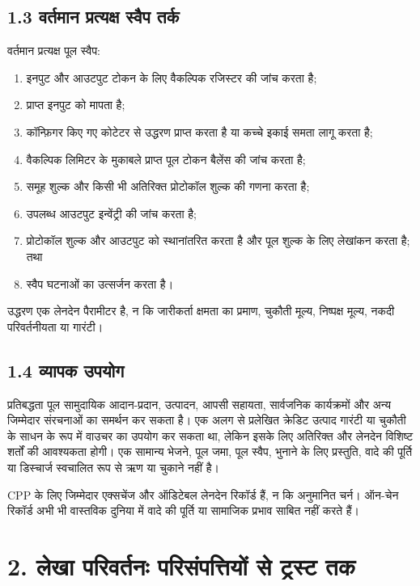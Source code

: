 \documentclass[11pt]{article}
\begin{document}
\subsection*{1.3 वर्तमान प्रत्यक्ष स्वैप तर्क}

वर्तमान प्रत्यक्ष पूल स्वैप:

\begin{enumerate}[leftmargin=*]
\item इनपुट और आउटपुट टोकन के लिए वैकल्पिक रजिस्टर की जांच करता है;
\item प्राप्त इनपुट को मापता है;
\item कॉन्फ़िगर किए गए कोटेटर से उद्धरण प्राप्त करता है या कच्चे इकाई समता लागू करता है;
\item वैकल्पिक लिमिटर के मुकाबले प्राप्त पूल टोकन बैलेंस की जांच करता है;
\item समूह शुल्क और किसी भी अतिरिक्त प्रोटोकॉल शुल्क की गणना करता है;
\item उपलब्ध आउटपुट इन्वेंट्री की जांच करता है;
\item प्रोटोकॉल शुल्क और आउटपुट को स्थानांतरित करता है और पूल शुल्क के लिए लेखांकन करता है; तथा
\item स्वैप घटनाओं का उत्सर्जन करता है।
\end{enumerate}
उद्धरण एक लेनदेन पैरामीटर है, न कि जारीकर्ता क्षमता का प्रमाण, चुकौती मूल्य, निष्पक्ष मूल्य, नकदी परिवर्तनीयता या गारंटी।

\subsection*{1.4 व्यापक उपयोग}

प्रतिबद्धता पूल सामुदायिक आदान-प्रदान, उत्पादन, आपसी सहायता, सार्वजनिक कार्यक्रमों और अन्य जिम्मेदार संरचनाओं का समर्थन कर सकता है। एक अलग से प्रलेखित क्रेडिट उत्पाद गारंटी या चुकौती के साधन के रूप में वाउचर का उपयोग कर सकता था, लेकिन इसके लिए अतिरिक्त और लेनदेन विशिष्ट शर्तों की आवश्यकता होगी। एक सामान्य भेजने, पूल जमा, पूल स्वैप, भुनाने के लिए प्रस्तुति, वादे की पूर्ति या डिस्चार्ज स्वचालित रूप से ऋण या चुकाने नहीं है।

CPP के लिए जिम्मेदार एक्सचेंज और ऑडिटेबल लेनदेन रिकॉर्ड हैं, न कि अनुमानित चर्न। ऑन-चेन रिकॉर्ड अभी भी वास्तविक दुनिया में वादे की पूर्ति या सामाजिक प्रभाव साबित नहीं करते हैं।


\section*{2. लेखा परिवर्तनः परिसंपत्तियों से ट्रस्ट तक}
\end{document}
